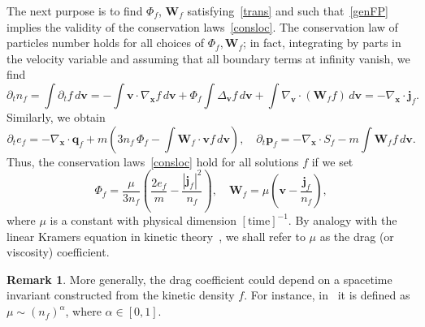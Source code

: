 \documentclass[12pt]{article}
\theoremstyle{definition}
\newtheorem*{remark}{Remark}
\numberwithin{equation}{section}
\begin{document}
The next purpose is to find $\Phi_f$, ${\bm W}_f$ satisfying~\eqref{trans} and such that~\eqref{genFP} implies the validity of the conservation laws~\eqref{consloc}. 
The conservation law of particles number holds for all choices of $\Phi_f, {\bm W}_f$; in fact, integrating by parts in the velocity variable and assuming that all boundary terms at infinity vanish, we find 
\[
\partial_tn_f = \int  \partial_tf\,d{\bm v}=-\int {\bm v}\cdot\nabla_{\bm x}f\,d{\bm v}+\Phi_f\int \Delta_{\bm v}f\,d{\bm v}+\int \nabla_{\bm v}\cdot({\bm W}_f f)\,d{\bm v}=-\nabla_{\bm x}\cdot{\bm j}_f.
\]
Similarly, we obtain
\[
\partial_te_f=-\nabla_{\bm x}\cdot {\bm q}_f+m\left(3n_f\,\Phi_f -\int {\bm W}_f\cdot{\bm v} f\,d{\bm v}\right),\quad \partial_t {\bm p}_f =-\nabla_{\bm x}\cdot S_f-m\int {\bm W}_ff\,d{\bm v}.
\]
Thus, the conservation laws~\eqref{consloc} hold for all solutions $f$ if we set 
\begin{equation}\label{wsigma}
\Phi_f=\frac{\mu}{3n_f}\left(\frac{2e_f}{m}-\frac{|{\bm j}_f|^2}{n_f}\right),\quad  {\bm W}_f=\mu\left({\bm v}-\frac{{\bm j}_f}{n_f}\right),
\end{equation}
where $\mu$ is a constant with physical dimension $[\mathrm{time}]^{-1}$. 
By analogy with the linear Kramers equation in kinetic theory~\cite{K}, we shall refer to $\mu$ as the drag (or viscosity) coefficient. 

\begin{remark}
\textnormal{More generally, the drag coefficient could depend on a spacetime invariant constructed from the kinetic density $f$. For instance, in~\cite[Eq.~(20)] {Villani} it is defined as $\mu\sim (n_f)^\alpha$, where $\alpha\in[0,1]$.}
\end{remark}
\end{document}
